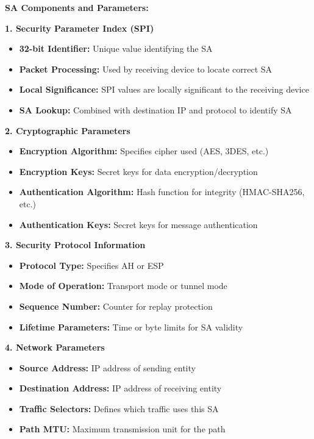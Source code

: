 \documentclass[12pt,a4paper]{article}
\begin{document}
\textbf{SA Components and Parameters:}

\textbf{1. Security Parameter Index (SPI)}
\begin{itemize}
    \item \textbf{32-bit Identifier:} Unique value identifying the SA
    \item \textbf{Packet Processing:} Used by receiving device to locate correct SA
    \item \textbf{Local Significance:} SPI values are locally significant to the receiving device
    \item \textbf{SA Lookup:} Combined with destination IP and protocol to identify SA
\end{itemize}

\textbf{2. Cryptographic Parameters}
\begin{itemize}
    \item \textbf{Encryption Algorithm:} Specifies cipher used (AES, 3DES, etc.)
    \item \textbf{Encryption Keys:} Secret keys for data encryption/decryption
    \item \textbf{Authentication Algorithm:} Hash function for integrity (HMAC-SHA256, etc.)
    \item \textbf{Authentication Keys:} Secret keys for message authentication
\end{itemize}

\textbf{3. Security Protocol Information}
\begin{itemize}
    \item \textbf{Protocol Type:} Specifies AH or ESP
    \item \textbf{Mode of Operation:} Transport mode or tunnel mode
    \item \textbf{Sequence Number:} Counter for replay protection
    \item \textbf{Lifetime Parameters:} Time or byte limits for SA validity
\end{itemize}

\textbf{4. Network Parameters}
\begin{itemize}
    \item \textbf{Source Address:} IP address of sending entity
    \item \textbf{Destination Address:} IP address of receiving entity
    \item \textbf{Traffic Selectors:} Defines which traffic uses this SA
    \item \textbf{Path MTU:} Maximum transmission unit for the path
\end{itemize}
\end{document}

